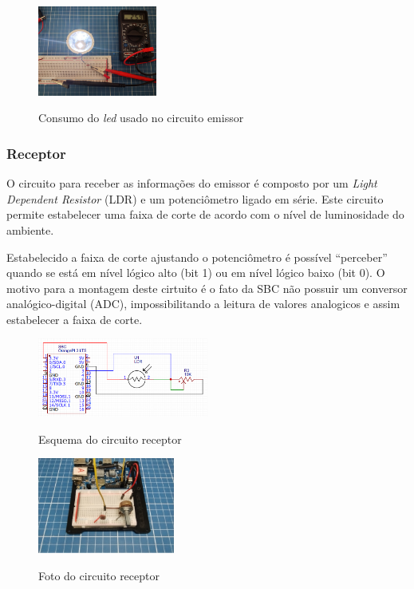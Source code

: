 \begin{figure}[!htbp]
  \caption{Consumo do \textit{led} usado no circuito emissor}
  \includegraphics[width=0.35\textwidth]{images/consumo_led.jpg}
  \label{corrente_led}
\end{figure}


\subsubsection{Receptor}

O circuito para receber as informações do emissor é composto por um \textit{Light Dependent Resistor} (LDR) e um potenciômetro ligado em série. Este circuito permite estabelecer uma faixa de corte de acordo com o nível de luminosidade do ambiente.

Estabelecido a faixa de corte ajustando o potenciômetro é possível ``perceber” quando se está em nível lógico alto (bit 1) ou em nível lógico baixo (bit 0). O motivo para a montagem deste cirtuito é o fato da SBC não possuir um conversor analógico-digital (ADC), impossibilitando a leitura de valores analogicos e assim estabelecer a faixa de corte.


\begin{figure}[!htbp]
  \caption{Esquema do circuito receptor}
  \includegraphics[width=0.5\textwidth]{images/esquema_circuito_receptor.png}
  \label{esquema-circuito-receptor}
\end{figure}


\begin{figure}[!htbp]
  \caption{Foto do circuito receptor}
  \includegraphics[width=0.4\textwidth]{images/foto_circuito_receptor.jpg}
  \label{foto-circuito-receptor}
\end{figure}


